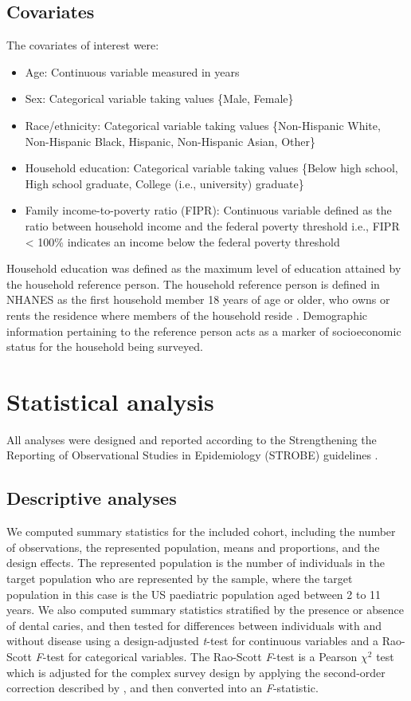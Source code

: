 \subsection{Covariates}

The covariates of interest were: 

\begin{itemize}
	\item Age: Continuous variable measured in years
	\item Sex: Categorical variable taking values \{Male, Female\}
	\item Race/ethnicity: Categorical variable taking values \{Non-Hispanic White, Non-Hispanic Black, Hispanic, Non-Hispanic Asian, Other\}
	\item Household education: Categorical variable taking values \{Below high school, High school graduate, College (i.e., university) graduate\}
	\item Family income-to-poverty ratio (FIPR): Continuous variable defined as the ratio between household income and the federal poverty threshold i.e., FIPR < 100\% indicates an income below the federal poverty threshold
\end{itemize}

Household education was defined as the maximum level of education attained by the household reference person. The household reference person is defined in NHANES as the first household member 18 years of age or older, who owns or rents the residence where members of the household reside \citep{nhanesdemo}. Demographic information pertaining to the reference person acts as a marker of socioeconomic status for the household being surveyed.

\section{Statistical analysis}

All analyses were designed and reported according to the Strengthening the Reporting of Observational Studies in Epidemiology (STROBE) guidelines \citep{strobe}.

\subsection{Descriptive analyses}

We computed summary statistics for the included cohort, including the number of observations, the represented population, means and proportions, and the design effects. The represented population is the number of individuals in the target population who are represented by the sample, where the target population in this case is the US paediatric population aged between 2 to 11 years. We also computed summary statistics stratified by the presence or absence of dental caries, and then tested for differences between individuals with and without disease using a design-adjusted \emph{t}-test for continuous variables and a Rao-Scott \emph{F}-test for categorical variables. The Rao-Scott \emph{F}-test is a Pearson $\chi^{2}$ test which is adjusted for the complex survey design by applying the second-order correction described by \citet{rao1984}, and then converted into an \emph{F}-statistic.

